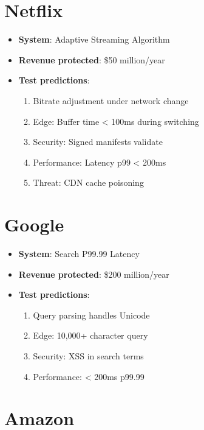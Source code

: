 \documentclass[12pt,a4paper]{report}
\begin{document}
\section{Netflix}

\begin{itemize}
    \item \textbf{System}: Adaptive Streaming Algorithm
    \item \textbf{Revenue protected}: \$50 million/year
    \item \textbf{Test predictions}:
    \begin{enumerate}
        \item Bitrate adjustment under network change
        \item Edge: Buffer time < 100ms during switching
        \item Security: Signed manifests validate
        \item Performance: Latency p99 < 200ms
        \item Threat: CDN cache poisoning
    \end{enumerate}
\end{itemize}

\section{Google}

\begin{itemize}
    \item \textbf{System}: Search P99.99 Latency
    \item \textbf{Revenue protected}: \$200 million/year
    \item \textbf{Test predictions}:
    \begin{enumerate}
        \item Query parsing handles Unicode
        \item Edge: 10,000+ character query
        \item Security: XSS in search terms
        \item Performance: < 200ms p99.99
    \end{enumerate}
\end{itemize}

\section{Amazon}
\end{document}
